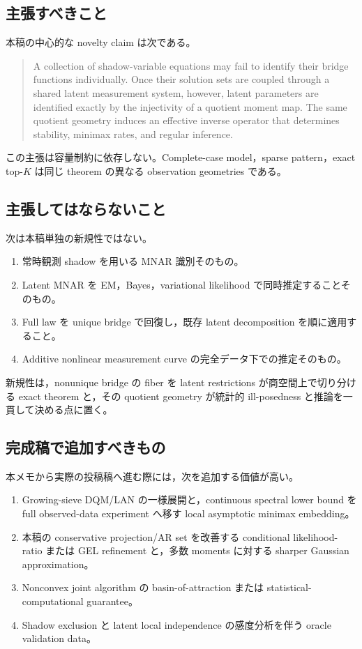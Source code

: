 \documentclass[11pt,a4paper]{ltjsarticle}
\theoremstyle{remark}
\begin{document}
\subsection{主張すべきこと}
本稿の中心的な novelty claim は次である。
\begin{quote}
A collection of shadow-variable equations may fail to identify their bridge functions individually. Once their solution sets are coupled through a shared latent measurement system, however, latent parameters are identified exactly by the injectivity of a quotient moment map. The same quotient geometry induces an effective inverse operator that determines stability, minimax rates, and regular inference.
\end{quote}
この主張は容量制約に依存しない。Complete-case model，sparse pattern，exact top-$K$ は同じ theorem の異なる observation geometries である。

\subsection{主張してはならないこと}
次は本稿単独の新規性ではない。
\begin{enumerate}[label=(\roman*)]
\item 常時観測 shadow を用いる MNAR 識別そのもの。
\item Latent MNAR を EM，Bayes，variational likelihood で同時推定することそのもの。
\item Full law を unique bridge で回復し，既存 latent decomposition を順に適用すること。
\item Additive nonlinear measurement curve の完全データ下での推定そのもの。
\end{enumerate}
新規性は，nonunique bridge の fiber を latent restrictions が商空間上で切り分ける exact theorem と，その quotient geometry が統計的 ill-posedness と推論を一貫して決める点に置く。

\subsection{完成稿で追加すべきもの}
本メモから実際の投稿稿へ進む際には，次を追加する価値が高い。
\begin{enumerate}[label=(\arabic*)]
\item Growing-sieve DQM/LAN の一様展開と，continuous spectral lower bound を full observed-data experiment へ移す local asymptotic minimax embedding。
\item 本稿の conservative projection/AR set を改善する conditional likelihood-ratio または GEL refinement と，多数 moments に対する sharper Gaussian approximation。
\item Nonconvex joint algorithm の basin-of-attraction または statistical-computational guarantee。
\item Shadow exclusion と latent local independence の感度分析を伴う oracle validation data。
\end{enumerate}
\end{document}
